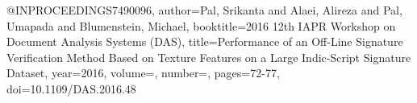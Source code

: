 @INPROCEEDINGS{7490096,
  author={Pal, Srikanta and Alaei, Alireza and Pal, Umapada and Blumenstein, Michael},
  booktitle={2016 12th IAPR Workshop on Document Analysis Systems (DAS)}, 
  title={Performance of an Off-Line Signature Verification Method Based on Texture Features on a Large Indic-Script Signature Dataset}, 
  year={2016},
  volume={},
  number={},
  pages={72-77},
  doi={10.1109/DAS.2016.48}}